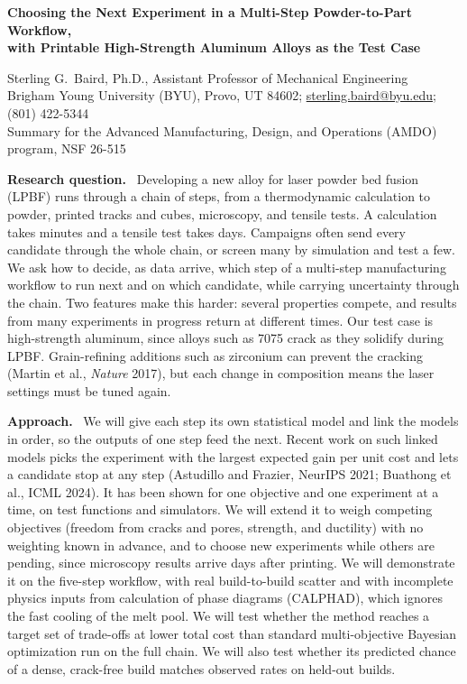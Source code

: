 \documentclass[11pt,letterpaper]{article}
\newcommand{\head}[1]{\textbf{#1.}\ }
\begin{document}
\begin{center}
{\large\bfseries Choosing the Next Experiment in a Multi-Step Powder-to-Part
Workflow,\\ with Printable High-Strength Aluminum Alloys as the Test
Case\par}
\vspace{4pt}
Sterling G.\ Baird, Ph.D., Assistant Professor of Mechanical Engineering\\
Brigham Young University (BYU), Provo, UT 84602;
\href{mailto:sterling.baird@byu.edu}{sterling.baird@byu.edu}; (801) 422-5344\\
Summary for the Advanced Manufacturing, Design, and Operations (AMDO)
program, NSF 26-515
\end{center}
\vspace{-4pt}

\head{Research question}
Developing a new alloy for laser powder bed fusion (LPBF) runs through a chain
of steps, from a thermodynamic calculation to powder, printed tracks and
cubes, microscopy, and tensile tests. A calculation takes minutes and a
tensile test takes days. Campaigns often send every candidate through the
whole chain, or screen many by simulation and test a few. We ask how to
decide, as data arrive, which step of a multi-step manufacturing workflow to
run next and on which candidate, while carrying uncertainty through the
chain. Two features make this harder: several properties compete, and results
from many experiments in progress return at different times. Our test case is high-strength
aluminum, since alloys such as 7075 crack as they solidify during LPBF.
Grain-refining additions such as zirconium can prevent the cracking (Martin et
al., \emph{Nature} 2017), but each change in composition means the laser
settings must be tuned again.

\head{Approach}
We will give each step its own statistical model and link the models in
order, so the outputs of one step feed the next. Recent work on
such linked models picks the experiment with the largest expected gain per
unit cost and lets a candidate stop at any step (Astudillo and Frazier,
NeurIPS 2021; Buathong et al., ICML 2024). It has been shown for one
objective and one experiment at a time, on test functions and simulators. We
will extend it to weigh competing objectives (freedom from cracks and pores,
strength, and ductility) with no weighting known in advance, and to choose
new experiments while others are pending, since microscopy results arrive days
after printing. We will demonstrate it on the five-step workflow,
with real build-to-build scatter and with incomplete physics inputs from
calculation of phase diagrams (CALPHAD), which ignores the fast cooling of the
melt pool. We will test whether the method reaches a target set of trade-offs at
lower total cost than standard multi-objective Bayesian optimization run on
the full chain. We will also test whether its predicted chance of a dense,
crack-free build matches observed rates on held-out builds.
\end{document}
